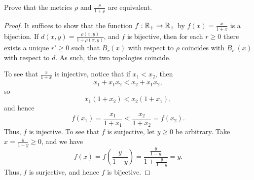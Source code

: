 \begin{minorEx}
    Prove that the metrics $\rho$ and $\frac{\rho}{1 + \rho}$ are equivalent.
\end{minorEx}

\begin{proof}
    It suffices to show that the function $f : \mathbb{R}_{+} \to \mathbb{R}_+$ by
    $f(x) = \frac{x}{1 + x}$ is a bijection. If $d(x,y) =
    \frac{\rho(x, y)}{1 + \rho(x, y)}$, and $f$ is bijective, then for
    each $r \geq 0$ there exists a unique $r' \geq 0$ such that $B_r(x)$
    with respect to $\rho$ coincides with $B_{r'}(x)$ with respect to
    $d$. As such, the two topologies coincide.
    
    To see that $\frac{x}{1 + x}$ is injective, notice that if $x_1 <
    x_2$, then
    \[
        x_1 + x_1 x_2 < x_2 + x_1 x_2,
    \]
    so
    \[
        x_1(1 + x_2) < x_2 (1 + x_1),
    \]
    and hence
    \[
        f(x_1) = \frac{x_1}{1 + x_1} < \frac{x_2}{1 + x_2} = f(x_2).
    \]
    Thus, $f$ is injective. To see that $f$ is surjective, let $y \geq
    0$ be arbitrary. Take $x = \frac{y}{1 - y} \geq 0$, and we have
    \[
        f(x) = f\left( \frac{y}{1 - y} \right) =
        \frac{\frac{y}{1-y}}{1 + \frac{y}{1-y}} = y.
    \]
    Thus, $f$ is surjective, and hence $f$ is bijective.
\end{proof}
